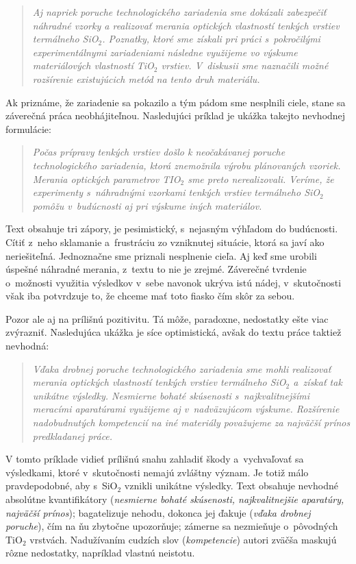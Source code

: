 \begin{quote}
  \emph{Aj napriek poruche technologického zariadenia sme
  dokázali zabezpečiť náhradné vzorky a realizovať merania
  optických vlastností tenkých vrstiev termálneho
  SiO$_\mathit{2}$.
  Poznatky, ktoré sme získali pri práci s~pokročilými
  experimentálnymi zariadeniami následne využijeme vo výskume
  materiálových vlastností TiO$_\mathit{2}$ vrstiev.
  V~diskusii sme naznačili možné rozšírenie existujúcich
  metód na tento druh materiálu.}
\end{quote}

Ak priznáme, že zariadenie sa pokazilo
a tým pádom sme nesplnili ciele,
stane sa záverečná práca neobhájiteľnou.
Nasledujúci príklad je ukážka takejto nevhodnej formulácie:

\begin{quote}
  \emph{Počas prípravy tenkých vrstiev došlo k neočakávanej
  poruche technologického zariadenia,
  ktorá znemožnila výrobu plánovaných vzoriek.
  Merania optických parametrov TIO$_\mathit2$
  sme preto nerealizovali.
  Veríme, že experimenty s~náhradnými vzorkami tenkých vrstiev
  termálneho SiO$_\mathit2$ pomôžu v~budúcnosti
  aj pri výskume iných materiálov.}
\end{quote}

Text obsahuje tri zápory, je pesimistický,
s~nejasným výhľadom do budúcnosti.
Cítiť z~neho sklamanie a~frustráciu zo vzniknutej situácie,
ktorá sa javí ako neriešiteľná.
Jednoznačne sme priznali nesplnenie cieľa.
Aj keď sme urobili úspešné náhradné merania,
z~textu to nie je zrejmé.
Záverečné tvrdenie o~možnosti využitia výsledkov
v~sebe navonok ukrýva istú nádej,
v~skutočnosti však iba potvrdzuje to,
že chceme mať toto fiasko čím skôr za sebou.

Pozor ale aj na prílišnú pozitivitu.
Tá môže, paradoxne, nedostatky ešte viac zvýrazniť.
Nasledujúca ukážka je síce optimistická,
avšak do textu práce taktiež nevhodná:

\begin{quote}
  \emph{Vďaka drobnej poruche technologického zariadenia sme
  mohli realizovať merania optických vlastností tenkých vrstiev
  termálneho SiO$_\mathit2$ a~získať tak unikátne výsledky.
  Nesmierne bohaté skúsenosti s~najkvalitnejšími meracími
  aparatúrami využijeme aj v~nadväzujúcom výskume.
  Rozšírenie nadobudnutých kompetencií na iné materiály
  považujeme za najväčší prínos predkladanej práce.}
\end{quote}

V tomto príklade vidieť prílišnú snahu zahladiť škody
a~vychvaľovať sa výsledkami,
ktoré v~skutočnosti nemajú zvláštny význam.
Je totiž málo pravdepodobné,
aby s~SiO$_2$ vznikli unikátne výsledky.
Text obsahuje nevhodné absolútne kvantifikátory
(\emph{nesmierne bohaté skúsenosti, najkvalitnejšie aparatúry,
najväčší prínos});
bagatelizuje nehodu, dokonca jej ďakuje
(\emph{vďaka drobnej poruche}),
čím na ňu zbytočne upozorňuje;
zámerne sa nezmieňuje o~pôvodných TiO$_2$ vrstvách.
Nadužívaním cudzích slov (\emph{kompetencie})
autori zväčša maskujú rôzne nedostatky,
napríklad vlastnú neistotu.

